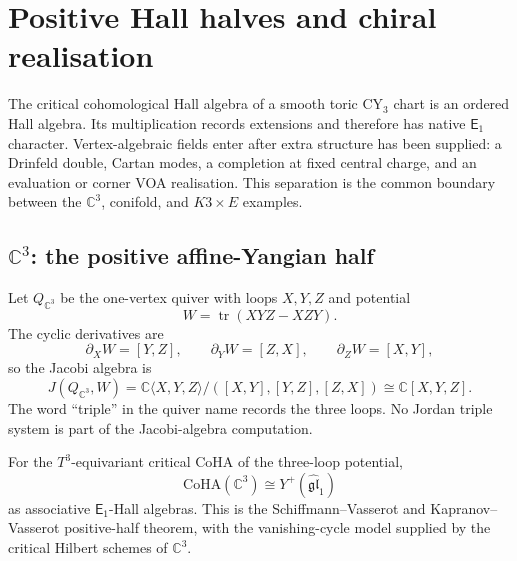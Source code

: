 
\section{Positive Hall halves and chiral realisation}
\label{wn:sec:coha-positive-half-w-infty-boundary}

\providecommand{\CoHA}{\mathrm{CoHA}}
\providecommand{\Wilpha}{\mathcal{W}_{1+\infty}}
\providecommand{\C}{\mathbb{C}}
\providecommand{\Z}{\mathbb{Z}}
\providecommand{\Q}{\mathbb{Q}}
\providecommand{\Eone}{\mathsf{E}_1}
\providecommand{\Etwo}{\mathsf{E}_2}
\providecommand{\Rep}{\mathrm{Rep}}
\providecommand{\End}{\mathrm{End}}
\providecommand{\Hilb}{\mathrm{Hilb}}
\providecommand{\hCS}{\mathrm{hCS}}
\providecommand{\cO}{\mathcal{O}}

The critical cohomological Hall algebra of a smooth toric CY$_3$ chart
is an ordered Hall algebra.  Its multiplication records extensions and
therefore has native \(\Eone\) character.  Vertex-algebraic fields enter
after extra structure has been supplied: a Drinfeld double, Cartan
modes, a completion at fixed central charge, and an evaluation or corner
VOA realisation.  This separation is the common boundary between the
\(\C^3\), conifold, and \(K3\times E\) examples.

\subsection{\texorpdfstring{\(\C^3\)}{C3}: the positive affine-Yangian half}
\label{wn:subsec:c3-positive-half}

Let \(Q_{\C^3}\) be the one-vertex quiver with loops \(X,Y,Z\) and
potential
\[
 W=\operatorname{tr}(XYZ-XZY).
\]
The cyclic derivatives are
\[
 \partial_X W=[Y,Z],\qquad
 \partial_Y W=[Z,X],\qquad
 \partial_Z W=[X,Y],
\]
so the Jacobi algebra is
\[
 J(Q_{\C^3},W)
 =
 \C\langle X,Y,Z\rangle/([X,Y],[Y,Z],[Z,X])
 \cong \C[X,Y,Z].
\]
The word ``triple'' in the quiver name records the three loops.  No
Jordan triple system is part of the Jacobi-algebra computation.

\begin{proposition}
\label{wn:prop:c3-coha-positive-half}
For the \(T^3\)-equivariant critical CoHA of the three-loop potential,
\[
 \CoHA(\C^3)\cong Y^+(\widehat{\mathfrak{gl}}_1)
\]
as associative \(\Eone\)-Hall algebras.  This is the Schiffmann--Vasserot
and Kapranov--Vasserot positive-half theorem, with the vanishing-cycle
model supplied by the critical Hilbert schemes of \(\C^3\).
\end{proposition}

